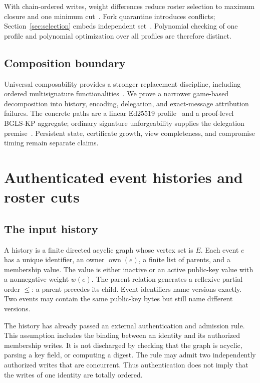 \documentclass[11pt]{article}
\theoremstyle{definition}
\newcommand{\own}{\operatorname{own}}
\begin{document}
With chain-ordered writes, weight differences reduce roster selection to maximum closure and one minimum cut~\cite{picard1976closure}.  Fork quarantine introduces conflicts; Section~\ref{sec:selection} embeds independent set~\cite{karp1972reducibility}.  Polynomial checking of one profile and polynomial optimization over all profiles are therefore distinct.

\subsection{Composition boundary}
Universal composability provides a stronger replacement discipline, including ordered multisignature functionalities~\cite{canetti2001uc,baum2025ordered}.  We prove a narrower game-based decomposition into history, encoding, delegation, and exact-message attribution failures.  The concrete paths are a linear Ed25519 profile~\cite{bernstein2012ed25519} and a proof-level BGLS-KP aggregate; ordinary signature unforgeability supplies the delegation premise~\cite{goldwasser1988digital}.  Persistent state, certificate growth, view completeness, and compromise timing remain separate claims.

\section{Authenticated event histories and roster cuts}\label{sec:model}
\subsection{The input history}
A history is a finite directed acyclic graph whose vertex set is $E$. Each event $e$ has a unique identifier, an owner $\own(e)$, a finite list of parents, and a membership value. The value is either inactive or an active public-key value with a nonnegative weight $w(e)$. The parent relation generates a reflexive partial order $\leq$: a parent precedes its child. Event identifiers name versions exactly. Two events may contain the same public-key bytes but still name different versions.

The history has already passed an external authentication and admission rule. This assumption includes the binding between an identity and its authorized membership writes. It is not discharged by checking that the graph is acyclic, parsing a key field, or computing a digest. The rule may admit two independently authorized writes that are concurrent. Thus authentication does not imply that the writes of one identity are totally ordered.
\end{document}
